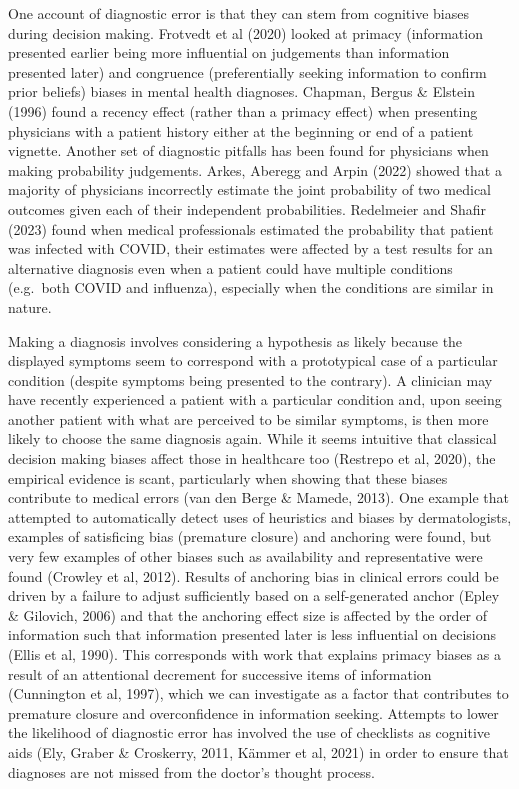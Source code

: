 \documentclass[a4paper, nobind]{templates/ociamthesis}
\begin{document}
One account of diagnostic error is that they can stem from cognitive biases during decision making. Frotvedt et al (2020) looked at primacy (information presented earlier being more influential on judgements than information presented later) and congruence (preferentially seeking information to confirm prior beliefs) biases in mental health diagnoses. Chapman, Bergus \& Elstein (1996) found a recency effect (rather than a primacy effect) when presenting physicians with a patient history either at the beginning or end of a patient vignette. Another set of diagnostic pitfalls has been found for physicians when making probability judgements. Arkes, Aberegg and Arpin (2022) showed that a majority of physicians incorrectly estimate the joint probability of two medical outcomes given each of their independent probabilities. Redelmeier and Shafir (2023) found when medical professionals estimated the probability that patient was infected with COVID, their estimates were affected by a test results for an alternative diagnosis even when a patient could have multiple conditions (e.g.~both COVID and influenza), especially when the conditions are similar in nature.

Making a diagnosis involves considering a hypothesis as likely because the displayed symptoms seem to correspond with a prototypical case of a particular condition (despite symptoms being presented to the contrary). A clinician may have recently experienced a patient with a particular condition and, upon seeing another patient with what are perceived to be similar symptoms, is then more likely to choose the same diagnosis again. While it seems intuitive that classical decision making biases affect those in healthcare too (Restrepo et al, 2020), the empirical evidence is scant, particularly when showing that these biases contribute to medical errors (van den Berge \& Mamede, 2013). One example that attempted to automatically detect uses of heuristics and biases by dermatologists, examples of satisficing bias (premature closure) and anchoring were found, but very few examples of other biases such as availability and representative were found (Crowley et al, 2012). Results of anchoring bias in clinical errors could be driven by a failure to adjust sufficiently based on a self-generated anchor (Epley \& Gilovich, 2006) and that the anchoring effect size is affected by the order of information such that information presented later is less influential on decisions (Ellis et al, 1990). This corresponds with work that explains primacy biases as a result of an attentional decrement for successive items of information (Cunnington et al, 1997), which we can investigate as a factor that contributes to premature closure and overconfidence in information seeking. Attempts to lower the likelihood of diagnostic error has involved the use of checklists as cognitive aids (Ely, Graber \& Croskerry, 2011, Kämmer et al, 2021) in order to ensure that diagnoses are not missed from the doctor's thought process.
\end{document}
